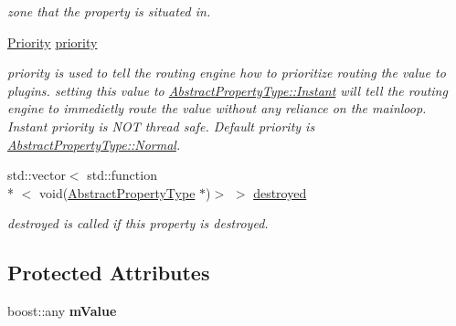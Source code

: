 \begin{DoxyCompactItemize}
\begin{DoxyCompactList}\small\item\em zone that the property is situated in. \end{DoxyCompactList}\item 
\hypertarget{classAbstractPropertyType_a3f831860b5ddc30e5a53dd4937ae5ebe}{\hyperlink{classAbstractPropertyType_a1e513f66eb2dd2bd2cddbec16422af63}{Priority} \hyperlink{classAbstractPropertyType_a3f831860b5ddc30e5a53dd4937ae5ebe}{priority}}\label{classAbstractPropertyType_a3f831860b5ddc30e5a53dd4937ae5ebe}

\begin{DoxyCompactList}\small\item\em priority is used to tell the routing engine how to prioritize routing the value to plugins. setting this value to \hyperlink{classAbstractPropertyType_a1e513f66eb2dd2bd2cddbec16422af63a5ef5703d3d1af9d204d6d2f3cf41569a}{Abstract\+Property\+Type\+::\+Instant} will tell the routing engine to immedietly route the value without any reliance on the mainloop. Instant priority is N\+O\+T thread safe. Default priority is \hyperlink{classAbstractPropertyType_a1e513f66eb2dd2bd2cddbec16422af63a3412bc77a6a781fb4a832059f1fe5d9a}{Abstract\+Property\+Type\+::\+Normal}. \end{DoxyCompactList}\item 
\hypertarget{classAbstractPropertyType_ab557c141cce1769d0e4d8213894c9e2c}{std\+::vector$<$ std\+::function\\*
$<$ void(\hyperlink{classAbstractPropertyType}{Abstract\+Property\+Type} $\ast$)$>$ $>$ \hyperlink{classAbstractPropertyType_ab557c141cce1769d0e4d8213894c9e2c}{destroyed}}\label{classAbstractPropertyType_ab557c141cce1769d0e4d8213894c9e2c}

\begin{DoxyCompactList}\small\item\em destroyed is called if this property is destroyed. \end{DoxyCompactList}\end{DoxyCompactItemize}
\subsection*{Protected Attributes}
\begin{DoxyCompactItemize}
\item 
\hypertarget{classAbstractPropertyType_a69b5d8cd643415d4f63cd6a9e19721d9}{boost\+::any {\bfseries m\+Value}}\label{classAbstractPropertyType_a69b5d8cd643415d4f63cd6a9e19721d9}

\end{DoxyCompactItemize}


